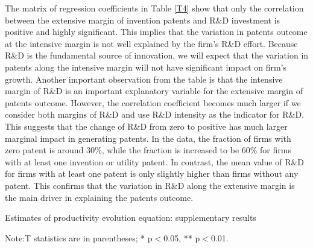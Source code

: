 \documentclass[11pt]{article}
\begin{document}
The matrix of regression coefficients in Table \ref{T4} show that only the correlation between the extensive margin of invention patents and R\&D investment is positive and highly significant. This implies that the variation in patents outcome at the intensive margin is not well explained by the firm's R\&D effort. Because R\&D is the fundamental source of innovation, we will expect that the variation in patents along the intensive margin will not have significant impact on firm's growth. Another important observation from the table is that the intensive margin of R\&D is an important explanatory variable for the extensive margin of patents outcome. However, the correlation coefficient becomes much larger if we consider both margins of R\&D and use R\&D intensity as the indicator for R\&D. This suggests that the change of R\&D from zero to positive has much larger marginal impact in generating patents. In the data, the fraction of firms with zero patent is around 30\%, while the fraction is increased to be 60\% for firms with at least one invention or utility patent. In contrast, the mean value of R\&D for firms with at least one patent is only slightly higher than firms without any patent. This confirms that the variation in R\&D along the extensive margin is the main driver in explaining the patents outcome. 

\begin{table}[h]

    \centering
    \caption{Estimates of productivity evolution equation: supplementary results}
    \label{TA}
    
    \caption*{\small{}Note:T statistics are in parentheses; {*} p$<$0.05, {*}{*}
    p$<$0.01. }{\small \par}
    \end{table}
    
\end{document}
